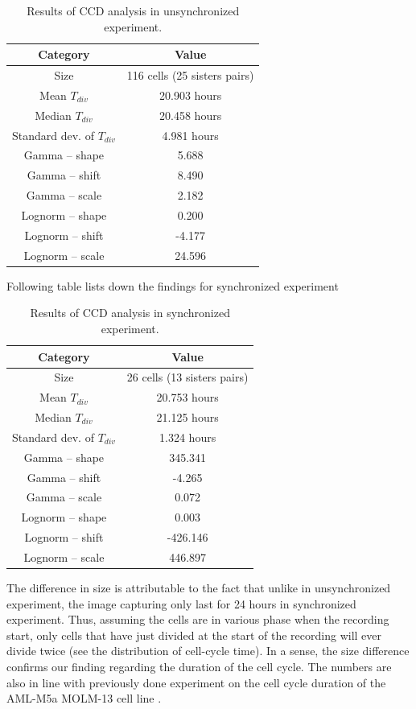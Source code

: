 \documentclass[pdftex,12pt,a4paper]{report}
\begin{document}
\begin{table}[H]
\centering
\begin{tabular}{ c | c }
Category & Value \\
\hline
Size & 116 cells (25 sisters pairs) \\
Mean $T_{div}$ & 20.903 hours \\
Median $T_{div}$ & 20.458 hours \\
Standard dev. of $T_{div}$ & 4.981 hours \\
\hline
Gamma -- shape & 5.688 \\
Gamma -- shift & 8.490 \\
Gamma -- scale & 2.182 \\
\hline Lognorm -- shape & 0.200 \\
Lognorm --  shift & -4.177 \\
Lognorm --  scale & 24.596 \\
\end{tabular}
\caption[Results of CCD analysis in unsynchronized experiment]{Results of CCD analysis in unsynchronized experiment.}
\label{table:ccd_res_unsyn}
\end{table}

Following table lists down the findings for synchronized experiment

\begin{table}[H]
\centering
\begin{tabular}{ c | c }
Category & Value \\
\hline
Size & 26 cells (13 sisters pairs) \\
Mean $T_{div}$ & 20.753 hours \\
Median $T_{div}$ & 21.125 hours \\
Standard dev. of $T_{div}$ & 1.324 hours \\
\hline
Gamma -- shape & 345.341 \\
Gamma -- shift & -4.265 \\
Gamma -- scale & 0.072 \\
\hline Lognorm -- shape & 0.003 \\
Lognorm --  shift & -426.146 \\
Lognorm --  scale & 446.897 \\
\end{tabular}
\caption[Results of CCD analysis in synchronized experiment]{Results of CCD analysis in synchronized experiment.}
\label{table:ccd_res_unsyn}
\end{table}

The difference in size is attributable to the fact that unlike in unsynchronized experiment, the image capturing only last for 24 hours in synchronized experiment. Thus, assuming the cells are in various phase when the recording start, only cells that have just divided at the start of the recording will ever divide twice (see the distribution of cell-cycle time). In a sense, the size difference confirms our finding regarding the duration of the cell cycle. The numbers are also in line with  previously done experiment on the cell cycle  duration of the AML-M5a MOLM-13 cell line \cite{sekhavati2015dynamic}.
\end{document}
